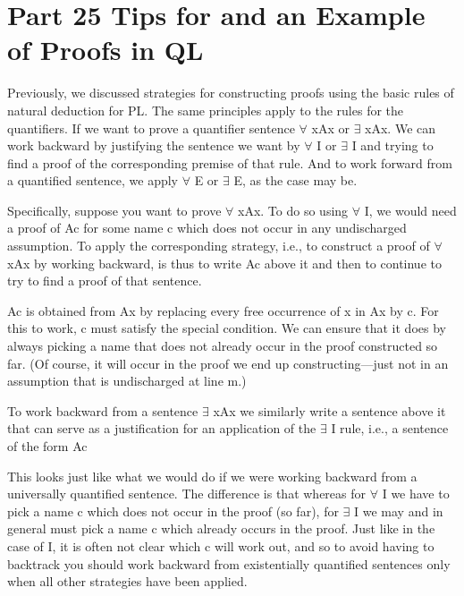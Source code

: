 \godel

\chapter{Part 25 Tips for and an Example of Proofs in QL}

Previously, we discussed strategies for constructing proofs using the basic rules of natural deduction for PL. The same principles apply to the rules for the quantifiers. If we want to prove a quantifier sentence $\forall$ xAx or $\exists$ xAx. We can work backward by justifying the sentence we want by $\forall$ I or $\exists$ I and trying to find a proof of the corresponding premise of that rule. And to work forward from a quantified sentence, we apply $\forall$ E or $\exists$ E, as the case may be.

Specifically, suppose you want to prove $\forall$ xAx. To do so using $\forall$ I, we would need a proof of Ac for some name c which does not occur in any undischarged assumption. To apply the corresponding strategy, i.e., to construct a proof of $\forall$ xAx by working backward, is thus to write Ac above it and then to continue to try to find a proof of that sentence.
\begin{fitchproof}
\ellipsesline					
{}			
\end{fitchproof}
Ac is obtained from Ax by replacing every free occurrence of x in Ax by c. For this to work, c must satisfy the special condition. We can ensure that it does by always picking a name that does not already occur in the proof constructed so far. (Of course, it will occur in the proof we end up constructing—just not in an assumption that is undischarged at line m.)

To work backward from a sentence $\exists$ xAx we similarly write a sentence above it that can serve as a justification for an application of the $\exists$ I rule, i.e., a sentence of the form Ac
\begin{fitchproof}
\ellipsesline
{}
\end{fitchproof}

This looks just like what we would do if we were working backward from a universally quantified sentence. The difference is that whereas for $\forall$ I we have to pick a name c which does not occur in the proof (so far), for $\exists$ I we may and in general must pick a name c which already occurs in the proof. Just like in the case of \eor I, it is often not clear which c will work out, and so to avoid having to backtrack you should work backward from existentially quantified sentences only when all other strategies have been applied.

